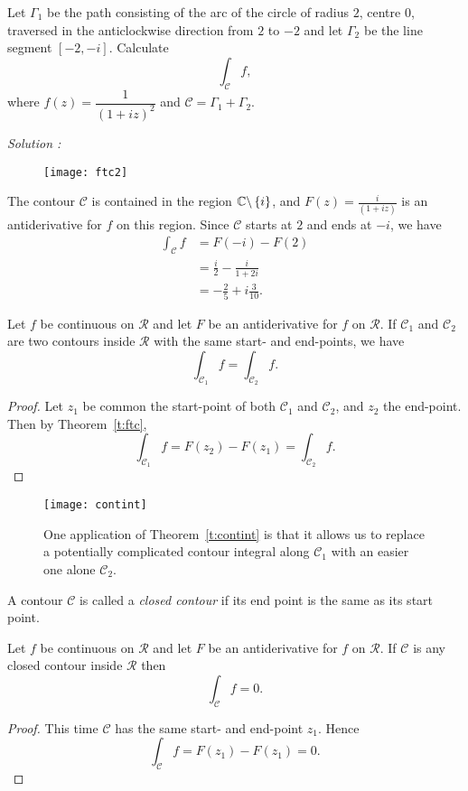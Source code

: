 \begin{example}
Let $\Gamma_1$ be the path consisting of the arc of the circle of radius $2$, centre $0$, traversed in the anticlockwise direction from $2$ to $-2$ and let $\Gamma_2$ be the line segment $[-2,-i]$.  Calculate
\[
\int_{\mathcal{C}} f,
\]
where $f(z) = \dfrac{1}{(1+iz)^2}$ and $\mathcal{C} = \Gamma_1+ \Gamma_2$.
\end{example}
\begin{absolutelynopagebreak}
\noindent\emph{Solution : }
\begin{wrapfigure}{r}[3cm]{5cm}
\texttt{[image: ftc2]}
\end{wrapfigure}
The contour $\mathcal{C}$ is contained in the region $\mathbb{C} \backslash \left\{i\right\}$, and $F(z) = \frac{i}{(1+iz)}$ is an antiderivative for $f$ on this region.  Since $\mathcal{C}$ starts at $2$ and ends at $-i$, we have
\begin{align*}
\int_{\mathcal{C}} f & = F(-i)-F(2) \\
& = \frac{i}{2} - \frac{i}{1+2i} \\
& = - \frac{2}{5} +i \frac{3}{10}.
\end{align*}
\end{absolutelynopagebreak}
\begin{theorem}
\label{t:contint}
Let $f$ be continuous on $\mathcal{R}$ and let $F$ be an antiderivative for $f$ on $\mathcal{R}$.  If $\mathcal{C}_1$ and $\mathcal{C}_2$ are two contours inside $\mathcal{R}$ with the same start- and end-points, we have
\[
\int_{\mathcal{C}_1} f = \int_{\mathcal{C}_2} f.
\]
\end{theorem}
\begin{proof}
Let $z_1$ be common the start-point of both $\mathcal{C}_1$ and $\mathcal{C}_2$, and $z_2$ the end-point.  Then by Theorem~\ref{t:ftc},
\[
\int_{\mathcal{C}_1} f = F(z_2)-F(z_1) = \int_{\mathcal{C}_2} f.
\]
\end{proof}
\begin{figure}[h]
\centering
\texttt{[image: contint]}
\caption{One application of Theorem~\ref{t:contint} is that it allows us to replace a potentially complicated contour integral along $\mathcal{C}_1$ with an easier one alone $\mathcal{C}_2$.}
\end{figure}

\begin{definition}
A contour $\mathcal{C}$ is called a \emph{closed contour} if its end point is the same as its start point.
\end{definition}
\begin{theorem}
\label{t:closed}
Let $f$ be continuous on $\mathcal{R}$ and let $F$ be an antiderivative for $f$ on $\mathcal{R}$.  If $\mathcal{C}$ is any closed contour inside $\mathcal{R}$ then
\[
\int_{\mathcal{C}} f = 0.
\]
\end{theorem}
\begin{proof}
This time $\mathcal{C}$ has the same start- and end-point $z_1$.  Hence
\[
\int_{\mathcal{C}} f = F(z_1)-F(z_1) = 0.
\]
\end{proof}


